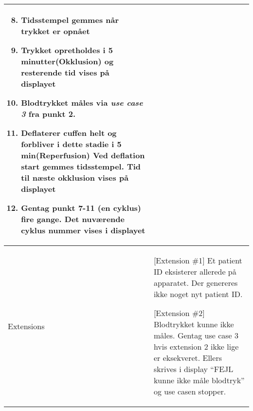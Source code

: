 \begin{center}
\begin{longtable}{ | m{4cm} | m{8cm}| }
\begin{enumerate}
				\setcounter{enumi}{7}				
				\item Tidsstempel gemmes når trykket er opnået
				\item Trykket opretholdes i 5 minutter(Okklusion) og resterende tid vises på displayet
				\item Blodtrykket måles via \textit{use case 3}
				fra punkt 2.
				\item Deflaterer cuffen helt og forbliver i dette stadie i 5 min(Reperfusion) Ved deflation start gemmes tidsstempel. Tid til næste okklusion vises på displayet
				\item Gentag punkt 7-11 (en cyklus) fire gange. Det nuværende cyklus nummer vises i displayet
			\end{enumerate} \\ 
			\hline
			Extensions & [Extension \#1] Et patient ID eksisterer allerede på apparatet. Der genereres ikke noget nyt patient ID.
			
			[Extension \#2] Blodtrykket kunne ikke måles. Gentag use case 3 hvis extension 2 ikke lige er eksekveret. Ellers skrives i display “FEJL kunne ikke måle blodtryk” og use casen stopper.  \\
			\hline
		\end{longtable}
		
	\end{center}